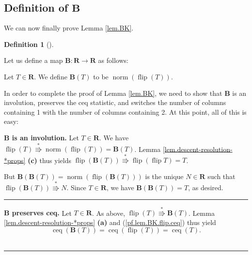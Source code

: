 \documentclass[numbers=enddot,12pt,final,onecolumn,notitlepage]{scrartcl}%
\theoremstyle{definition}
\newtheorem{defi}[theo]{Definition}
\newenvironment{definition}[1][]
{\begin{defi}[#1]\begin{leftbar}}
{\end{leftbar}\end{defi}}
\newenvironment{proof}[1][Proof]{\noindent\textbf{#1.} }{\ \rule{0.5em}{0.5em}}
\begin{document}
\subsection{Definition of $\mathbf{B}$}

We can now finally prove Lemma \ref{lem.BK}.

\begin{definition}
Let us define a map $\mathbf{B}:\mathbf{R}\rightarrow\mathbf{R}$ as follows:

Let $T\in\mathbf{R}$. We define $\mathbf{B}\left(
T\right)  $ to be $\operatorname*{norm}\left(  \operatorname*{flip}\left(
T\right)  \right)  $.
\end{definition}

In order to complete the proof of Lemma
\ref{lem.BK}, we need to show that $\mathbf{B}$ is an involution, preserves the ceq statistic, and switches the number of columns containing 1 with the number of columns containing 2. At this point, all of this is easy:

\begin{proof}[$\mathbf{B}$ is an involution]
Let $T\in \mathbf{R}$. We have $\operatorname*{flip}\left(
T\right)  \overset{\ast}{\Rrightarrow}\operatorname*{norm}\left(
\operatorname*{flip}\left(  T\right)  \right)  =
\mathbf{B}\left(  T\right)  $. Lemma \ref{lem.descent-resolution-*props} \textbf{(c)} thus yields $\operatorname*{flip}\left(  \mathbf{B}\left(  T\right)
\right)  \overset{\ast}{\Rrightarrow}\operatorname*{flip}\left(
\operatorname*{flip}T\right)  = T$.

But $\mathbf{B}(\mathbf{B}(T)) = \operatorname*{norm}\left(  \operatorname*{flip}\left(
\mathbf{B}\left(  T\right)  \right)  \right)  $ is the unique $N\in\mathbf{R}$
such that $\operatorname*{flip}\left(  \mathbf{B}\left(  T\right)  \right)
\overset{\ast}{\Rrightarrow}N$. Since $T \in \mathbf{R}$, we have $\mathbf{B}(\mathbf{B}(T)) = T$, as desired.
\end{proof}

\begin{proof}[$\mathbf{B}$ preserves ceq]
Let $T\in\mathbf{R}$. As above, $\operatorname*{flip}\left(  T\right)  \overset{\ast
}{\Rrightarrow}\mathbf{B}\left(  T\right)  $. Lemma \ref{lem.descent-resolution-*props} \textbf{(a)} and (\ref{pf.lem.BK.flip.ceq}) thus yield
\[
\operatorname*{ceq}\left(  \mathbf{B}\left(  T\right)  \right)
=\operatorname*{ceq}\left(  \operatorname*{flip}\left(  T\right)  \right)
=\operatorname*{ceq}\left(  T\right).
\]
\end{proof}
\end{document}
